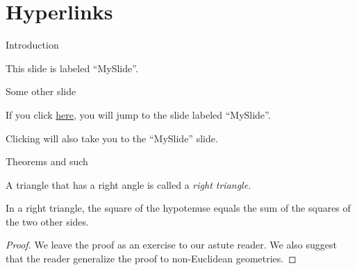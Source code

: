 \documentclass[leqno]{beamer}
\begin{document}
\section{Hyperlinks}

\begin{frame}[label=MySlide]{Introduction}

This slide is labeled ``MySlide''.

\end{frame}

\begin{frame}{Some other slide}

If you click \hyperlink{MySlide}{here}, you will jump to the slide
labeled ``MySlide''.

\bigskip

Clicking \hyperlink{MySlide}{} will also
take you to the ``MySlide'' slide.

\end{frame}

\begin{frame}{Theorems and such}

\begin{definition}
  A triangle that has a right angle is called
  a \emph{right triangle}.
\end{definition}

\begin{theorem}
  In a right triangle, the square of the hypotenuse
  equals the sum of the squares of the two other sides.
\end{theorem}

\begin{proof}
  We leave the proof as an exercise to our astute reader.
  We also suggest that the reader generalize the proof to
  non-Euclidean geometries.
\end{proof}

\end{frame}
\end{document}
